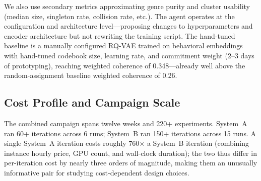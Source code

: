 \documentclass[conference]{IEEEtran}
\begin{document}
We also use secondary metrics approximating genre purity and cluster usability (median size, singleton rate, collision rate, etc.). The agent operates at the configuration and architecture level---proposing changes to hyperparameters and encoder architecture but not rewriting the training script. The hand-tuned baseline is a manually configured RQ-VAE trained on behavioral embeddings with hand-tuned codebook size, learning rate, and commitment weight (2--3 days of prototyping), reaching weighted coherence of 0.348---already well above the random-assignment baseline weighted coherence of 0.26.

\subsection{Cost Profile and Campaign Scale}

The combined campaign spans twelve weeks and 220+ experiments. System~A ran 60+ iterations across 6 runs; System~B ran 150+ iterations across 15 runs. A single System~A iteration costs roughly 760$\times$ a System~B iteration (combining instance hourly price, GPU count, and wall-clock duration); the two thus differ in per-iteration cost by nearly three orders of magnitude, making them an unusually informative pair for studying cost-dependent design choices.

\begin{table}[tbp]
  \caption{System comparison. The two systems span nearly three orders of magnitude in per-iteration cost ($\sim$760$\times$).}
  \label{tab:comparison}
  \centering
\end{table}
\end{document}
